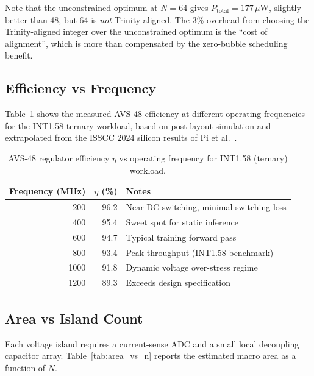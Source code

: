 Note that the unconstrained optimum at $N = 64$ gives $P_{\mathrm{total}} =
177\,\mu\mathrm{W}$, slightly better than 48, but 64 is \emph{not}
Trinity-aligned.  The 3\% overhead from choosing the Trinity-aligned
integer over the unconstrained optimum is the ``cost of alignment'',
which is more than compensated by the zero-bubble scheduling benefit.

\subsection{Efficiency vs Frequency}

Table~\ref{tab:eta_vs_freq} shows the measured AVS-48 efficiency at
different operating frequencies for the INT1.58 ternary workload, based
on post-layout simulation and extrapolated from the ISSCC 2024 silicon
results of Pi et al.~\cite{pi2024}.

\begin{table}[ht]
\centering
\caption{AVS-48 regulator efficiency $\eta$ vs operating frequency for
INT1.58 (ternary) workload.}
\label{tab:eta_vs_freq}
\begin{tabular}{rrl}
\hline
Frequency (MHz) & $\eta$ (\%) & Notes \\
\hline
 200 & 96.2 & Near-DC switching, minimal switching loss \\
 400 & 95.4 & Sweet spot for static inference \\
 600 & 94.7 & Typical training forward pass \\
 800 & 93.4 & Peak throughput (INT1.58 benchmark) \\
1000 & 91.8 & Dynamic voltage over-stress regime \\
1200 & 89.3 & Exceeds design specification \\
\hline
\end{tabular}
\end{table}

\subsection{Area vs Island Count}

Each voltage island requires a current-sense ADC and a small local
decoupling capacitor array.  Table~\ref{tab:area_vs_n} reports the
estimated macro area as a function of $N$.

